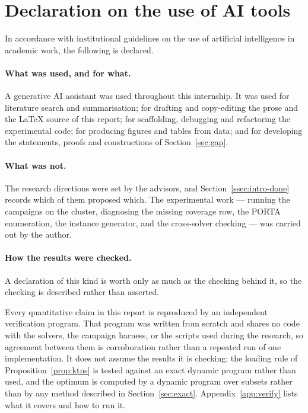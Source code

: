 \section{Declaration on the use of AI tools}\label{sec:ai}

In accordance with institutional guidelines on the use of artificial intelligence in
academic work, the following is declared.

\paragraph{What was used, and for what.}
A generative AI assistant was used throughout this internship. It was used for
literature search and summarisation; for drafting and copy-editing the prose and the
\LaTeX{} source of this report; for scaffolding, debugging and refactoring the
experimental code; for producing figures and tables from data; and for developing the
statements, proofs and constructions of Section~\ref{sec:gap}.

\paragraph{What was not.}
The research directions were set by the advisors, and Section~\ref{ssec:intro-done}
records which of them proposed which. The experimental work --- running the campaigns
on the cluster, diagnosing the missing coverage row, the PORTA enumeration, the
instance generator, and the cross-solver checking --- was carried out by the author.

\paragraph{How the results were checked.}
A declaration of this kind is worth only as much as the checking behind it, so the
checking is described rather than asserted.

Every quantitative claim in this report is reproduced by an independent verification
program. That program was written from scratch and shares no code with the solvers,
the campaign harness, or the scripts used during the research, so agreement between
them is corroboration rather than a repeated run of one implementation. It does not
assume the results it is checking: the loading rule of Proposition~\ref{prop:ktns} is
tested against an exact dynamic program rather than used, and the optimum is computed
by a dynamic program over subsets rather than by any method described in
Section~\ref{sec:exact}. Appendix~\ref{app:verify} lists what it covers and how to run
it.

